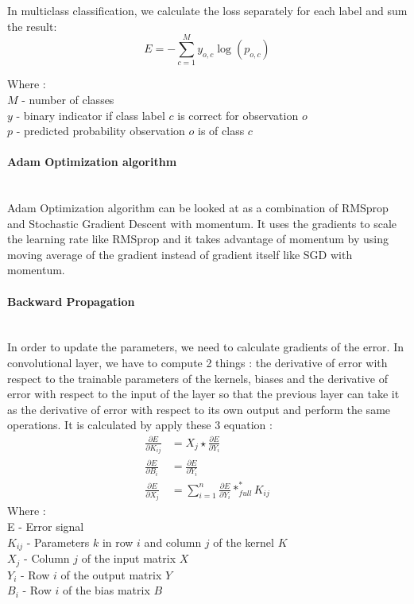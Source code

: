 \documentclass[runningheads]{llncs}
\begin{document}
In multiclass classification, we calculate the loss separately for each label and sum the result:
\begin{equation}
E = -\sum_{c=1}^{M} y_{o, c} \log \left(p_{o, c}\right)
\end{equation}

\noindent    Where : \\
$M$ - number of classes \\
$y$ - binary indicator if class label $c$ is correct for observation $o$ \\
$p$ - predicted probability observation $o$ is of class $c$ 

\paragraph{\large\bf Adam Optimization algorithm}\hspace*{\fill} \\
Adam Optimization algorithm can be looked at as a combination of RMSprop and Stochastic Gradient Descent with momentum. It uses the gradients to scale the learning rate like RMSprop and it takes advantage of momentum by using moving average of the gradient instead of gradient itself like SGD with momentum\cite{adam}.

\paragraph{\large\bf Backward Propagation}\hspace*{\fill} \\
In order to update the parameters, we need to calculate gradients of the error. In convolutional layer, we have to compute 2 things : the derivative of error with respect to the trainable parameters of the kernels, biases and the derivative of error with respect to the input of the layer so that the previous layer can take it as the derivative of error with respect to its own output and perform the same operations. It is calculated by apply these 3 equation : 
\begin{equation}
\begin{aligned}
\frac{\partial E}{\partial K_{i j}} &=X_{j} \star \frac{\partial E}{\partial Y_{i}} \\
\frac{\partial E}{\partial B_{i}} &=\frac{\partial E}{\partial Y_{i}} \\
\frac{\partial E}{\partial X_{j}} &=\sum_{i=1}^{n} \frac{\partial E}{\partial Y_{i}} *_{f u l l}^{*} K_{i j}
\end{aligned}
\end{equation}
Where : \\
E - Error signal \\ 
$K_{i j}$ - Parameters $k$ in row $i$ and column $j$ of the kernel $K$ \\
$X_{j}$ - Column $j$ of the input matrix $X$ \\ 
$Y_{i}$ - Row $i$ of the output matrix $Y$ \\ 
$B_{i}$ - Row $i$ of the bias matrix $B$ 
\end{document}
